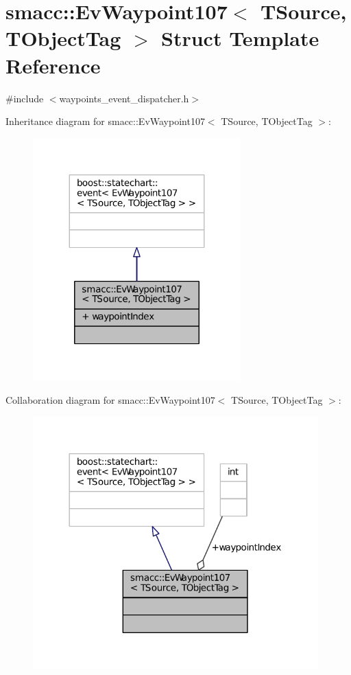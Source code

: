 \hypertarget{structsmacc_1_1EvWaypoint107}{}\section{smacc\+:\+:Ev\+Waypoint107$<$ T\+Source, T\+Object\+Tag $>$ Struct Template Reference}
\label{structsmacc_1_1EvWaypoint107}


{\ttfamily \#include $<$waypoints\+\_\+event\+\_\+dispatcher.\+h$>$}



Inheritance diagram for smacc\+:\+:Ev\+Waypoint107$<$ T\+Source, T\+Object\+Tag $>$\+:
\nopagebreak
\begin{figure}[H]
\begin{center}
\leavevmode
\includegraphics[width=227pt]{structsmacc_1_1EvWaypoint107__inherit__graph}
\end{center}
\end{figure}


Collaboration diagram for smacc\+:\+:Ev\+Waypoint107$<$ T\+Source, T\+Object\+Tag $>$\+:
\nopagebreak
\begin{figure}[H]
\begin{center}
\leavevmode
\includegraphics[width=312pt]{structsmacc_1_1EvWaypoint107__coll__graph}
\end{center}
\end{figure}
